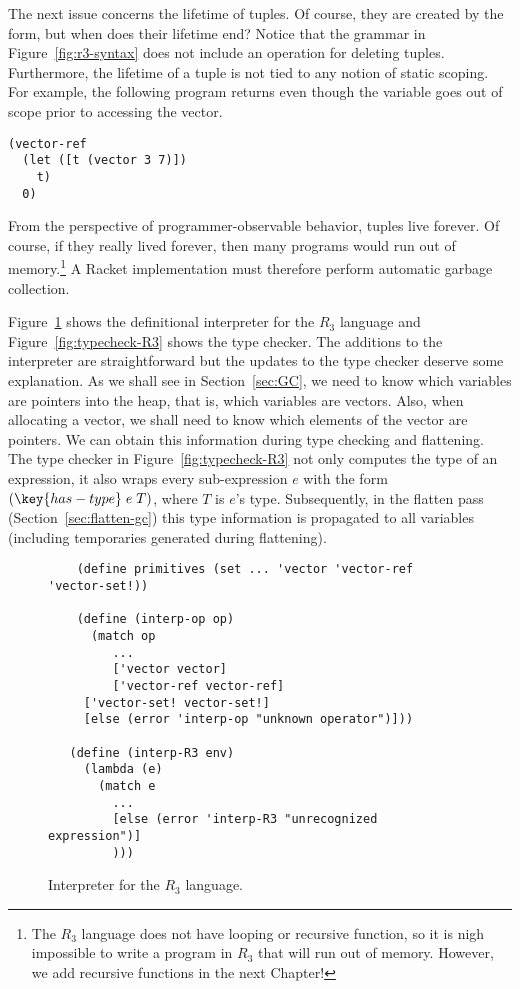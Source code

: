 \documentclass[11pt]{book}
\begin{document}
The next issue concerns the lifetime of tuples. Of course, they are
created by the  form, but when does their lifetime end?
Notice that the grammar in Figure~\ref{fig:r3-syntax} does not include
an operation for deleting tuples. Furthermore, the lifetime of a tuple
is not tied to any notion of static scoping. For example, the
following program returns  even though the variable 
goes out of scope prior to accessing the vector.
\begin{lstlisting}
(vector-ref
  (let ([t (vector 3 7)])
    t)
  0)
\end{lstlisting}
From the perspective of programmer-observable behavior, tuples live
forever. Of course, if they really lived forever, then many programs
would run out of memory.\footnote{The $R_3$ language does not have
  looping or recursive function, so it is nigh impossible to write a
  program in $R_3$ that will run out of memory. However, we add
  recursive functions in the next Chapter!} A Racket implementation
must therefore perform automatic garbage collection.

Figure~\ref{fig:interp-R3} shows the definitional interpreter for the
$R_3$ language and Figure~\ref{fig:typecheck-R3} shows the type
checker. The additions to the interpreter are straightforward but the
updates to the type checker deserve some explanation.  As we shall see
in Section~\ref{sec:GC}, we need to know which variables are pointers
into the heap, that is, which variables are vectors. Also, when
allocating a vector, we shall need to know which elements of the
vector are pointers. We can obtain this information during type
checking and flattening. The type checker in
Figure~\ref{fig:typecheck-R3} not only computes the type of an
expression, it also wraps every sub-expression $e$ with the form
$(\key{has-type}\; e\; T)$, where $T$ is $e$'s type. Subsequently, in
the flatten pass (Section~\ref{sec:flatten-gc}) this type information is
propagated to all variables (including temporaries generated during
flattening).

\begin{figure}[tbp]
\begin{lstlisting}
    (define primitives (set ... 'vector 'vector-ref 'vector-set!))

    (define (interp-op op)
      (match op
         ...
         ['vector vector]
         ['vector-ref vector-ref]
	 ['vector-set! vector-set!]
	 [else (error 'interp-op "unknown operator")]))

   (define (interp-R3 env)
     (lambda (e)
       (match e
         ...
         [else (error 'interp-R3 "unrecognized expression")]
         )))
\end{lstlisting}
\caption{Interpreter for the $R_3$ language.}
\label{fig:interp-R3}
\end{figure}
\end{document}
